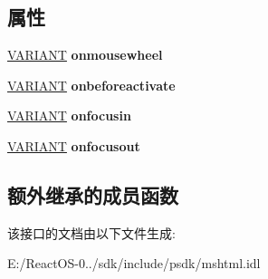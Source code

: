 \subsection*{属性}
\begin{DoxyCompactItemize}
\item 
\mbox{\label{interface_m_s_h_t_m_l_1_1_i_h_t_m_l_element4_ac2c7da52fbc7eac0222bdbce02d5d6cc}} 
\hyperlink{structtag_v_a_r_i_a_n_t}{V\+A\+R\+I\+A\+NT} {\bfseries onmousewheel}
\item 
\mbox{\label{interface_m_s_h_t_m_l_1_1_i_h_t_m_l_element4_a8dab49ecc71c5a040788a07898466c35}} 
\hyperlink{structtag_v_a_r_i_a_n_t}{V\+A\+R\+I\+A\+NT} {\bfseries onbeforeactivate}
\item 
\mbox{\label{interface_m_s_h_t_m_l_1_1_i_h_t_m_l_element4_a75b7dafa6850d8b363b49862edf78546}} 
\hyperlink{structtag_v_a_r_i_a_n_t}{V\+A\+R\+I\+A\+NT} {\bfseries onfocusin}
\item 
\mbox{\label{interface_m_s_h_t_m_l_1_1_i_h_t_m_l_element4_a2c4f6b62cdde8a43590eef7547a8742a}} 
\hyperlink{structtag_v_a_r_i_a_n_t}{V\+A\+R\+I\+A\+NT} {\bfseries onfocusout}
\end{DoxyCompactItemize}
\subsection*{额外继承的成员函数}


该接口的文档由以下文件生成\+:\begin{DoxyCompactItemize}
\item 
E\+:/\+React\+O\+S-\/0../sdk/include/psdk/mshtml.\+idl\end{DoxyCompactItemize}
